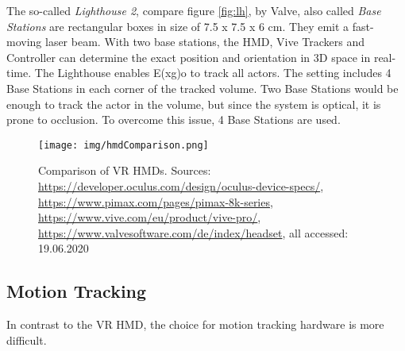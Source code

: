 The so-called \textit{Lighthouse 2}, compare figure \ref{fig:lh}, by Valve, also called \textit{Base Stations} are rectangular boxes in size of 7.5 x 7.5 x 6 cm. They emit a fast-moving laser beam. With two base stations, the HMD, Vive Trackers and Controller can determine the exact position and orientation in 3D space in real-time. The Lighthouse enables E(x\textbar g)o to track all actors. The setting includes 4 Base Stations in each corner of the tracked volume. Two Base Stations would be enough to track the actor in the volume, but since the system is optical, it is prone to occlusion. To overcome this issue, 4 Base Stations are used. 


\begin{figure}
	\centering
	\texttt{[image: img/hmdComparison.png]}
	\caption{Comparison of VR HMDs. Sources: \href{https://developer.oculus.com/design/oculus-device-specs/}{https://developer.oculus.com/design/oculus-device-specs/}, \href{https://www.pimax.com/pages/pimax-8k-series}{https://www.pimax.com/pages/pimax-8k-series}, \href{https://www.vive.com/eu/product/vive-pro/}{https://www.vive.com/eu/product/vive-pro/}, \href{https://www.valvesoftware.com/de/index/headset}{https://www.valvesoftware.com/de/index/headset}, all accessed: 19.06.2020
	}
	\label{fig:hmdComparison}
\end{figure}
\subsection{Motion Tracking}
In contrast to the VR HMD, the choice for motion tracking hardware is more difficult.\\


